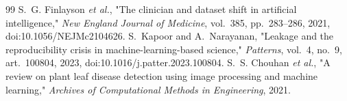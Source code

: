 \documentclass[10pt,twocolumn,a4paper]{article}
\begin{document}
{\begin{thebibliography}{99}
 S.~G. Finlayson \emph{et al.}, "The clinician and dataset shift in artificial intelligence," \emph{New England Journal of Medicine}, vol.~385, pp.~283--286, 2021, doi:10.1056/NEJMc2104626.
 S.~Kapoor and A.~Narayanan, "Leakage and the reproducibility crisis in machine-learning-based science," \emph{Patterns}, vol.~4, no.~9, art.~100804, 2023, doi:10.1016/j.patter.2023.100804.
 S.~S. Chouhan \emph{et al.}, "A review on plant leaf disease detection using image processing and machine learning," \emph{Archives of Computational Methods in Engineering}, 2021.

\end{thebibliography}
}

\onecolumn
\appendix
\renewcommand{\thesection}{Appendix~\Alph{section}}

\end{document}

